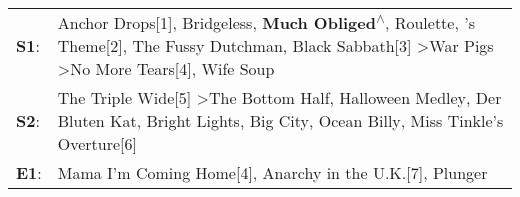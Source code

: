 \begin{supertabular}{p{0.03\textwidth}p{0.92\textwidth}}
 \textbf{S1}:  &  Anchor Drops[1]\textsuperscript{}, \enspace Bridgeless\textsuperscript{}, \enspace \textbf{Much Obliged\textsuperscript{$\wedge$}}, \enspace Roulette\textsuperscript{}, 's Theme[2]\textsuperscript{}, \enspace The Fussy Dutchman\textsuperscript{}, \enspace Black Sabbath[3]\textsuperscript{} \textgreater \enspace War Pigs\textsuperscript{} \textgreater \enspace No More Tears[4]\textsuperscript{}, \enspace Wife Soup\textsuperscript{}  \enspace  \\
 \textbf{S2}:  &                                                                                                                         The Triple Wide[5]\textsuperscript{} \textgreater \enspace The Bottom Half\textsuperscript{}, \enspace Halloween Medley\textsuperscript{}, \enspace Der Bluten Kat\textsuperscript{}, \enspace Bright Lights, Big City\textsuperscript{}, \enspace Ocean Billy\textsuperscript{}, \enspace Miss Tinkle's Overture[6]\textsuperscript{}  \enspace  \\
 \textbf{E1}:  &                                                                                                                                                                                                                                                                                                                               Mama I'm Coming Home[4]\textsuperscript{}, \enspace Anarchy in the U.K.[7]\textsuperscript{}, \enspace Plunger\textsuperscript{}  \enspace  \\
\end{supertabular}
